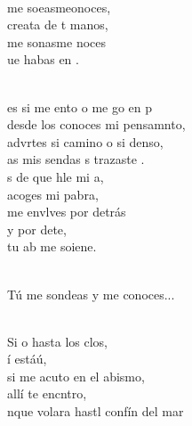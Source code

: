 \documentclass[12pt]{article}
\begin{document}
\begin{multicols*}{2}
\begin{cancion}%
	\begin{chorus}%
	       \\
	 me soeasmeonoces, \\
	 creata de t manos, \\
	 me sonasme noces \\
	ue habas en . \\
	\end{chorus}%
	\jump\\
	es si me ento o me go en p \\
	desde los conoces mi pensamnto, \\
	advrtes si camino o si denso, \\
	as mis sendas s trazaste .  \\
	s de que hle mi a, \\
	 acoges mi pabra,  \\
	me envlves por detrás \\
	y por dete,\\
	tu ab me soiene.\\\jump\\
	\begin{chorus}%
Tú me sondeas y me conoces... \\
	\end{chorus}%
	\jump\\
	Si o hasta los clos,\\
	í estáú, \\
	si me acuto en el abismo, \\
	allí te encntro, \\
	nque volara hastl confín del mar\\

\end{cancion}
\end{multicols*}
\end{document}

